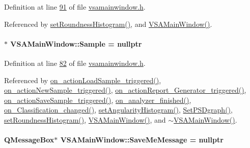 Definition at line \hyperlink{vsamainwindow_8h_source_l00091}{91} of file \hyperlink{vsamainwindow_8h_source}{vsamainwindow.\+h}.



Referenced by \hyperlink{vsamainwindow_8cpp_source_l00291}{set\+Roundness\+Histogram()}, and \hyperlink{vsamainwindow_8cpp_source_l00004}{V\+S\+A\+Main\+Window()}.

\hypertarget{class_v_s_a_main_window_a09d2f0c3ef8247e9c46932f866cab132}{}
\paragraph[{Sample}]{$\ast$ V\+S\+A\+Main\+Window\+::\+Sample = nullptr\hspace{0.3cm}{\ttfamily [private]}}\label{class_v_s_a_main_window_a09d2f0c3ef8247e9c46932f866cab132}


Definition at line \hyperlink{vsamainwindow_8h_source_l00082}{82} of file \hyperlink{vsamainwindow_8h_source}{vsamainwindow.\+h}.



Referenced by \hyperlink{vsamainwindow_8cpp_source_l00475}{on\+\_\+action\+Load\+Sample\+\_\+triggered()}, \hyperlink{vsamainwindow_8cpp_source_l00361}{on\+\_\+action\+New\+Sample\+\_\+triggered()}, \hyperlink{vsamainwindow_8cpp_source_l00552}{on\+\_\+action\+Report\+\_\+\+Generator\+\_\+triggered()}, \hyperlink{vsamainwindow_8cpp_source_l00460}{on\+\_\+action\+Save\+Sample\+\_\+triggered()}, \hyperlink{vsamainwindow_8cpp_source_l00275}{on\+\_\+analyzer\+\_\+finished()}, \hyperlink{vsamainwindow_8cpp_source_l00522}{on\+\_\+\+Classification\+\_\+changed()}, \hyperlink{vsamainwindow_8cpp_source_l00315}{set\+Angularity\+Histogram()}, \hyperlink{vsamainwindow_8cpp_source_l00285}{Set\+P\+S\+Dgraph()}, \hyperlink{vsamainwindow_8cpp_source_l00291}{set\+Roundness\+Histogram()}, \hyperlink{vsamainwindow_8cpp_source_l00004}{V\+S\+A\+Main\+Window()}, and \hyperlink{vsamainwindow_8cpp_source_l00254}{$\sim$\+V\+S\+A\+Main\+Window()}.

\hypertarget{class_v_s_a_main_window_a9d76854fefeb5abf8f2fd6089987a31c}{}
\paragraph[{Save\+Me\+Message}]{\setlength{\rightskip}{0pt plus 5cm}Q\+Message\+Box$\ast$ V\+S\+A\+Main\+Window\+::\+Save\+Me\+Message = nullptr\hspace{0.3cm}{\ttfamily [private]}}\label{class_v_s_a_main_window_a9d76854fefeb5abf8f2fd6089987a31c}


